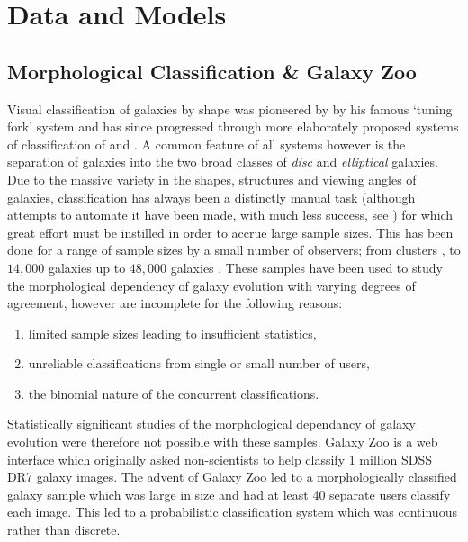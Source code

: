\documentclass{mn2e}
\begin{document}
\section{Data and Models}\label{data}

\subsection{Morphological Classification \& Galaxy Zoo}
Visual classification of galaxies by shape was pioneered by \citet{Hubble26} by his famous `tuning fork' system and has since progressed through more elaborately proposed systems of classification of \citet{deV59} and \citet{Sandage75}. A common feature of all systems however is the separation of galaxies into the two broad classes of \emph{disc} and \emph{elliptical} galaxies. Due to the massive variety in the shapes, structures and viewing angles of galaxies, classification has always been a distinctly manual task (although attempts to automate it have been made, with much less success, see \citealt{NA10}) for which great effort must be instilled in order to accrue large sample sizes. This has been done for a range of sample sizes by a small number of observers; from clusters \citep{Dressler80, SB84, Smail97, Michard08}, to $14,000$ galaxies \citep{NA10} up to $48,000$ galaxies \citep{Sch07}. These samples have been used to study the morphological dependency of galaxy evolution with varying degrees of agreement, however are incomplete for the following reasons:
\begin{enumerate}
\item limited sample sizes leading to insufficient statistics,
\item unreliable classifications from single or small number of users,
\item the binomial nature of the concurrent classifications. 
\end{enumerate}

Statistically significant studies of the morphological dependancy of galaxy evolution were therefore not possible with these samples. Galaxy Zoo \citep{Lintott08} is a web interface which originally asked non-scientists to help classify 1 million SDSS DR7 galaxy images. The advent of Galaxy Zoo led to a morphologically classified galaxy sample which was large in size and had at least 40 separate users classify each image. This led to a probabilistic classification system which was continuous rather than discrete.
\end{document}
